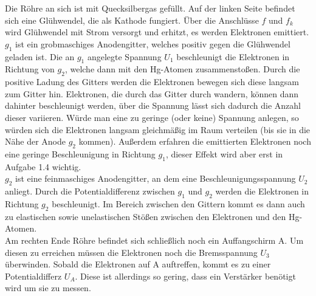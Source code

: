\documentclass[a4paper,titlepage]{scrartcl}
\numberwithin{equation}{section}
\begin{document}
Die Röhre an sich ist mit Quecksilbergas gefüllt. Auf der linken Seite befindet sich eine Glühwendel, die als Kathode fungiert. Über die Anschlüsse $f$ und $f_k$ wird Glühwendel mit Strom versorgt und erhitzt, es werden Elektronen emittiert.\\
$g_1$ ist ein grobmaschiges Anodengitter, welches positiv gegen die Glühwendel geladen ist. Die an $g_1$ angelegte Spannung $U_1$ beschleunigt die Elektronen in Richtung von $g_2$, welche dann mit den Hg-Atomen zusammenstoßen. Durch die positive Ladung des Gitters werden die Elektronen bewegen sich diese langsam zum Gitter hin. Elektronen, die durch das Gitter durch wandern, können dann dahinter beschleunigt werden, über die Spannung lässt sich dadurch die Anzahl dieser variieren. Würde man eine zu geringe (oder keine) Spannung anlegen, so würden sich die Elektronen langsam gleichmäßig im Raum verteilen (bis sie in die Nähe der Anode $g_2$ kommen). Außerdem erfahren die emittierten Elektronen noch eine geringe Beschleunigung in Richtung $g_1$, dieser Effekt wird aber erst in Aufgabe 1.4 wichtig.\\
$g_2$ ist eine feinmaschiges Anodengitter, an dem eine Beschleunigungsspannung $U_2$ anliegt. Durch die Potentialdifferenz zwischen $g_1$ und $g_2$ werden die Elektronen in Richtung $g_2$ beschleunigt. Im Bereich zwischen den Gittern kommt es dann auch zu elastischen sowie unelastischen Stößen zwischen den Elektronen und den Hg-Atomen.\\
Am rechten Ende Röhre befindet sich schließlich noch ein Auffangschirm A. Um diesen zu erreichen müssen die Elektronen noch die Bremsspannung $U_3$ überwinden. Sobald die Elektronen auf A auftreffen, kommt es zu einer Potentialdifferz $U_A$. Diese ist allerdings so gering, dass ein Verstärker benötigt wird um sie zu messen.\\
\end{document}
